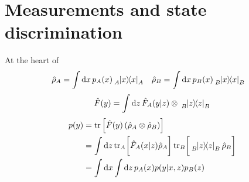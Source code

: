 \section{Measurements and state discrimination}

At the heart of 
\begin{align}
	\hat\rho_A
	&=
	\int\dd{x}p_A(x)
	\tensor[_A]{\ketbra{x}}{_A}
	&
	\hat\rho_B
	&=
	\int\dd{x}p_B(x)
	\tensor[_B]{\ketbra{x}}{_B}
\end{align}
\begin{equation}
	\hat{F}(y)
	=
	\int\dd{z}
	\hat{F}_A(y\vert z)
	\otimes
	\tensor[_B]{\ketbra{z}}{_B}
\end{equation}
\begin{equation}
	\begin{split}
		p(y)
		&=
		\tr\left[
			\hat{F}(y)
			\left(\hat\rho_A\otimes\hat\rho_B\right)
		\right]
		\\
		&=
		\int\dd{z}
		\tr_A\biggl[
			\hat{F}_A(x\vert z)
			\hat\rho_A
		\biggr]
		\tr_B\biggl[
			\tensor[_B]{\ketbra{z}}{_B}
			\hat\rho_B
		\biggr]
		\\
		&=
		\int\dd{x}
		\int\dd{z}
		p_A(x)
		p(y\vert x,z)
		p_B(z)		
	\end{split}
\end{equation}